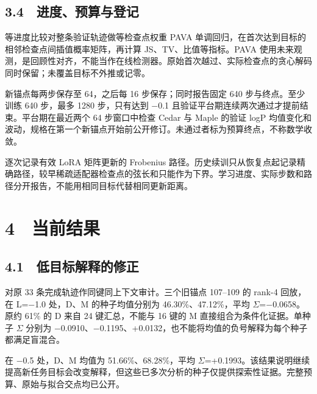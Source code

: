 \documentclass[UTF8,fontset=fandol,10pt,a4paper]{ctexart}
\begin{document}
\subsection*{3.4　进度、预算与登记}
等进度比较对整条验证轨迹做等检查点权重 PAVA 单调回归，在首次达到目标的相邻检查点间插值概率矩阵，再计算 JS、TV、比值等指标。PAVA 使用未来观测，是回顾性对齐，不能当作在线检测器。原始首次越过、实际检查点的贪心解码同时保留；未覆盖目标不外推或记零。



新锚点每两步保存至 64，之后每 16 步保存；同时报告固定 640 步与终点。至少训练 640 步，最多 1280 步，只有达到 \(-\)0.1 且验证平台期连续两次通过才提前结束。平台期在最近两个 64 步窗口中检查 Cedar 与 Maple 的验证 logP 均值变化和波动，规格在第一个新锚点开始前公开修订。未通过者标为预算终点，不称数学收敛。



逐次记录有效 LoRA 矩阵更新的 Frobenius 路径。历史续训只从恢复点起记录精确路径，较早稀疏适配器检查点的弦长和只能作为下界。学习进度、实际步数和路径分开报告，不能用相同目标代替相同更新距离。



\section*{4　当前结果}
\subsection*{4.1　低目标解释的修正}
对原 33 条完成轨迹作同键同上下文审计。三个旧锚点 107–109 的 rank-4 回放，在 L=\(-\)1.0 处，D、M 的种子均值分别为 46.30\%、47.12\%，平均 \(\Sigma\)=\(-\)0.0658。原约 61\% 的 D 来自 24 键汇总，不能与 16 键的 M 直接组合为条件化证据。单种子 \(\Sigma\) 分别为 \(-\)0.0910、\(-\)0.1195、+0.0132，也不能将均值的负号解释为每个种子都满足盲混合。



在 \(-\)0.5 处，D、M 均值为 51.66\%、68.28\%，平均 \(\Sigma\)=+0.1993。该结果说明继续提高新任务目标会改变解释，但这些已多次分析的种子仅提供探索性证据。完整预算、原始与拟合交点均已公开。
\end{document}
